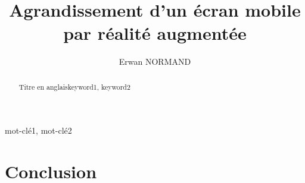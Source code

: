 \documentclass[letterpaper, twoside, 12pt,%
  memoire, francais, creativecommons, hyperref, withAlgo2e%
]{thETS}
\title{Agrandissement d'un écran mobile par réalité augmentée}
\author{Erwan NORMAND}
\begin{document}

\maketitle
\presentjury

%  

\begin{remerciements}
  
\end{remerciements}

\begin{sommaire}{mot-clé1, mot-clé2}
  
\end{sommaire}

\begin{abstract}{Titre en anglais}{keyword1, keyword2}
  
\end{abstract}

\tableofcontents
\listoftables
\listoffigures

\begin{listofabbr}[3cm]
  
\end{listofabbr}

%  

\cleardoublepage
{}
\reversemarginpar

\begin{introduction}
  
\end{introduction}






\chapter*{Conclusion}


\appendix


\newpage
\begin{spacing}{1}
  \nocite{*}
  
  
\end{spacing}
\end{document}
